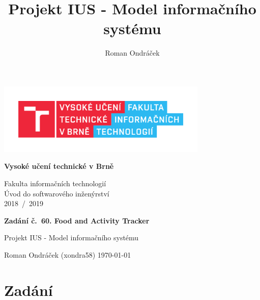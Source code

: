\documentclass[12pt,a4paper]{article}
\author{Roman Ondráček}
\title{Projekt IUS - Model informačního systému}
\begin{document}
\pagestyle{empty}

\begin{center}

\includegraphics[height = 96pt]{img/FIT_barevne_CMYK_CZ.pdf} \\

\begin{LARGE}
\textbf{Vysoké učení technické v Brně} \\
\end{LARGE}

\begin{large}
Fakulta informačních technologií \\
Úvod do softwarového inženýrství \\
2018~/~2019 \\
\end{large}

\vspace{128pt}

\begin{huge}
\textbf{Zadání č.~60. Food and Activity Tracker} \\
\end{huge}

\begin{large}
Projekt IUS - Model informačního systému \\
\end{large}

\end{center}

\vfill

Roman Ondráček (xondra58) \hfill \today

\pagestyle{plain}

\newpage

\section*{Zadání}
\end{document}
